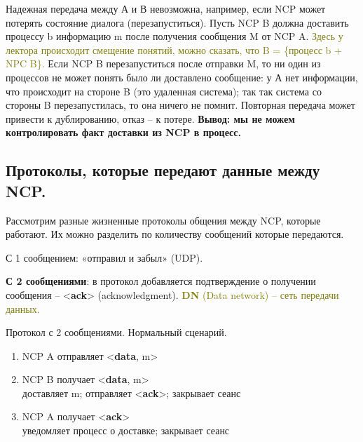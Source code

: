 Надежная передача между А и В невозможна, например, если NCP может потерять состояние диалога (перезапуститься).
Пусть NCP B должна доставить процессу b информацию m после получения сообщения M от NCP A.
\textcolor{olive}{Здесь у лектора происходит смещение понятий, можно сказать, что B = \{процесс b + NPC B\}.}
Если NCP B перезапуститься после отправки M, то ни один из процессов не может понять было ли доставлено сообщение: у А нет информации, что происходит на стороне B (это удаленная система); так так система со стороны B перезапустилась, то она ничего не помнит.
Повторная передача может привести к дублированию, отказ -- к потере.
\textbf{Вывод: мы не можем контролировать факт доставки из NCP в процесс.}

\subsection*{Протоколы, которые передают данные между NCP.}
Рассмотрим разные жизненные протоколы общения между NCP, которые работают. Их можно разделить по количеству сообщений которые передаются.

С 1 сообщением: «отправил и забыл» (UDP).

\textbf{С 2 сообщениями}: в протокол добавляется подтверждение о получении сообщения -- <\textbf{ack}> (acknowledgment).
\textcolor{olive}{\textbf{DN} (Data network) -- сеть передачи данных.}

\begin{algorithm}
	\caption{Протокол с 2 сообщениями. Нормальный сценарий.}
	\begin{enumerate}
		\item NCP A отправляет <\textbf{data}, m>
		\item NCP B получает <\textbf{data}, m> \\
			доставляет m; отправляет <\textbf{ack}>; закрывает сеанс
		\item NCP A получает <\textbf{ack}> \\
			уведомляет процесс о доставке; закрывает сеанс
	\end{enumerate}
\end{algorithm}


